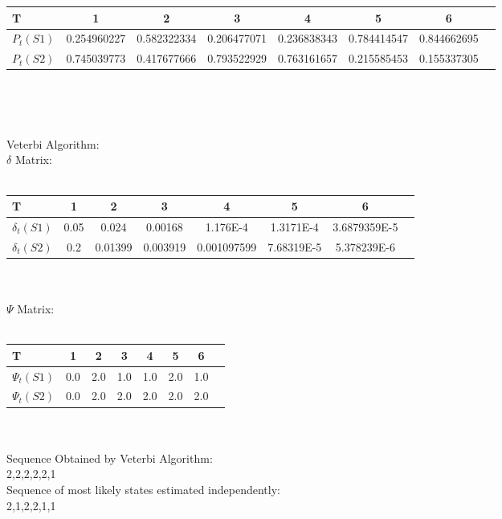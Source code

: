 \documentclass[paper=a4, fontsize=11pt]{scrartcl} %
\numberwithin{equation}{section} %
\numberwithin{figure}{section} %
\numberwithin{table}{section} %
\begin{document}
\begin{tabular}{l*{7}{c}}
\textbf{T} & \textbf{1} &  \textbf{2} & \textbf{3} & \textbf{4} & \textbf{5} & \textbf{6} \\
\hline
\textbf{$P_{t}(S1)$} & 0.254960227 & 0.582322334 & 0.206477071 & 0.236838343 & 0.784414547 & 0.844662695\\
\textbf{$P_{t}(S2)$} & 0.745039773 & 0.417677666 & 0.793522929 & 0.763161657 & 0.215585453 & 0.155337305
\end{tabular}\\\\

\subsection{}

Veterbi Algorithm:\\

$\delta$ Matrix:\\\\
\begin{tabular}{l*{7}{c}}
\textbf{T} & \textbf{1} &  \textbf{2} & \textbf{3} & \textbf{4} & \textbf{5} & \textbf{6} \\
\hline
\textbf{$\delta_{t}(S1)$} & 0.05 & 0.024 & 0.00168 & 1.176E-4 & 1.3171E-4 & 3.6879359E-5 \\
\textbf{$\delta_{t}(S2)$} & 0.2 & 0.01399 & 0.003919 & 0.001097599 & 7.68319E-5 & 5.378239E-6
\end{tabular}\\\\


$\Psi$ Matrix:\\\\
\begin{tabular}{l*{7}{c}}
\textbf{T} & \textbf{1} &  \textbf{2} & \textbf{3} & \textbf{4} & \textbf{5} & \textbf{6} \\
\hline
\textbf{$\Psi_{t}(S1)$} & 0.0 & 2.0 & 1.0 & 1.0 & 2.0 & 1.0 \\
\textbf{$\Psi_{t}(S2)$} & 0.0 & 2.0 & 2.0 & 2.0 & 2.0 & 2.0
\end{tabular}\\\\

Sequence Obtained by Veterbi Algorithm:\\
2,2,2,2,2,1\\

Sequence of most likely states estimated independently:\\
2,1,2,2,1,1\\
\end{document}
